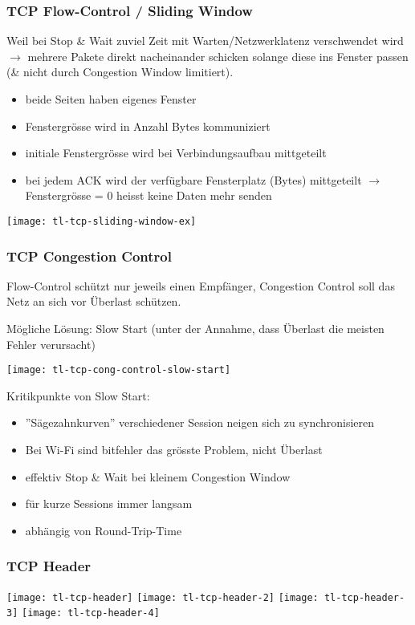\subsubsection{TCP Flow-Control / Sliding Window}

Weil bei Stop \& Wait zuviel Zeit mit Warten/Netzwerklatenz verschwendet wird
$\rightarrow$ mehrere Pakete direkt nacheinander schicken solange diese ins
Fenster passen (\& nicht durch Congestion Window limitiert).

\begin{itemize}
    \item beide Seiten haben eigenes Fenster
    \item Fenstergrösse wird in Anzahl Bytes kommuniziert
    \item initiale Fenstergrösse wird bei Verbindungsaufbau mittgeteilt
    \item bei jedem ACK wird der verfügbare Fensterplatz (Bytes) mittgeteilt
          $\rightarrow$ Fenstergrösse = 0 heisst keine Daten mehr senden
\end{itemize}

\begin{center}
    \texttt{[image: tl-tcp-sliding-window-ex]}
\end{center}


\subsubsection{TCP Congestion Control}

Flow-Control schützt nur jeweils einen Empfänger, Congestion Control soll das Netz
an sich vor Überlast schützen.

Mögliche Lösung: Slow Start (unter der Annahme, dass Überlast die meisten Fehler
verursacht)

\begin{center}
    \texttt{[image: tl-tcp-cong-control-slow-start]}
\end{center}


Kritikpunkte von Slow Start:
\begin{itemize}
    \item ''Sägezahnkurven'' verschiedener Session neigen sich zu synchronisieren
    \item Bei Wi-Fi sind bitfehler das grösste Problem, nicht Überlast
    \item effektiv Stop \& Wait bei kleinem Congestion Window
    \item für kurze Sessions immer langsam
    \item abhängig von Round-Trip-Time
\end{itemize}


\subsubsection{TCP Header}

\begin{center}
    \texttt{[image: tl-tcp-header]}
    \texttt{[image: tl-tcp-header-2]}
    \texttt{[image: tl-tcp-header-3]}
    \texttt{[image: tl-tcp-header-4]}
\end{center}



